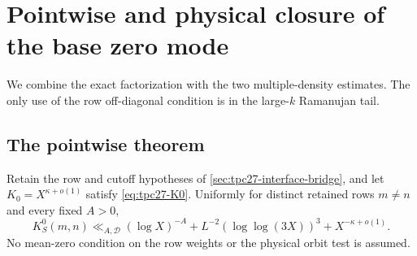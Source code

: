 \section{Pointwise and physical closure of the base zero mode}
\label{sec:tpc27-base-zero-closure}

We combine the exact factorization with the two multiple-density
estimates.  The only use of the row off-diagonal condition is in the
large-\(k\) Ramanujan tail.

\subsection{The pointwise theorem}

\begin{theorem}
\label{thm:tpc27-pointwise-base-zero}
Retain the row and cutoff hypotheses of
\cref{sec:tpc27-interface-bridge}, and let \(K_0=X^{\kappa+o(1)}\)
satisfy \eqref{eq:tpc27-K0}.  Uniformly for distinct retained rows
\(m\ne n\) and every fixed \(A>0\),
\begin{equation}
 \boxed{
 K_S^0(m,n)
 \ll_{A,\mathscr D}
 (\log X)^{-A}
 +L^{-2}(\log\log(3X))^3
 +X^{-\kappa+o(1)}.}
 \label{eq:tpc27-pointwise-base-zero}
\end{equation}
No mean-zero condition on the row weights or the physical orbit test is
assumed.
\end{theorem}

